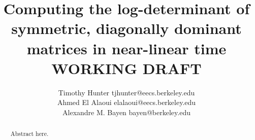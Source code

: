 \documentclass[onefignum,onetabnum]{siamltex1213}
\title{Computing the log-determinant of symmetric, diagonally dominant matrices
in near-linear time\\
WORKING DRAFT}
\author{Timothy Hunter \email tjhunter@eecs.berkeley.edu \\
Ahmed {El Alaoui} \email elalaoui@eecs.berkeley.edu\\
Alexandre M. Bayen \email bayen@berkeley.edu}
\begin{document}
\maketitle

\begin{abstract}
Abstract here.
\end{abstract}

\begin{keywords}\end{keywords}

\begin{AMS}\end{AMS}


\pagestyle{myheadings}

\thispagestyle{plain}















% 

% 
\end{document}
